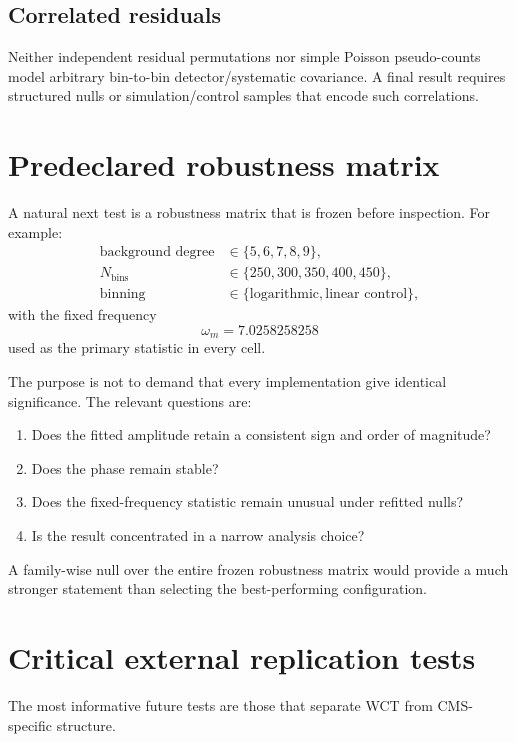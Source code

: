 \documentclass[11pt]{article}
\begin{document}
\subsection{Correlated residuals}

Neither independent residual permutations nor simple Poisson pseudo-counts
model arbitrary bin-to-bin detector/systematic covariance.  A final result
requires structured nulls or simulation/control samples that encode such
correlations.

\section{Predeclared robustness matrix}

A natural next test is a robustness matrix that is frozen before inspection.
For example:
\begin{align}
\text{background degree} &\in \{5,6,7,8,9\},\\
N_{\mathrm{bins}} &\in \{250,300,350,400,450\},\\
\text{binning} &\in \{\text{logarithmic},\text{linear control}\},
\end{align}
with the fixed frequency
\begin{equation}
\omega_m=7.0258258258
\end{equation}
used as the primary statistic in every cell.

The purpose is not to demand that every implementation give identical
significance.  The relevant questions are:
\begin{enumerate}
    \item Does the fitted amplitude retain a consistent sign and order of
          magnitude?
    \item Does the phase remain stable?
    \item Does the fixed-frequency statistic remain unusual under refitted
          nulls?
    \item Is the result concentrated in a narrow analysis choice?
\end{enumerate}

A family-wise null over the entire frozen robustness matrix would provide a
much stronger statement than selecting the best-performing configuration.

\section{Critical external replication tests}

The most informative future tests are those that separate WCT from
CMS-specific structure.
\end{document}
